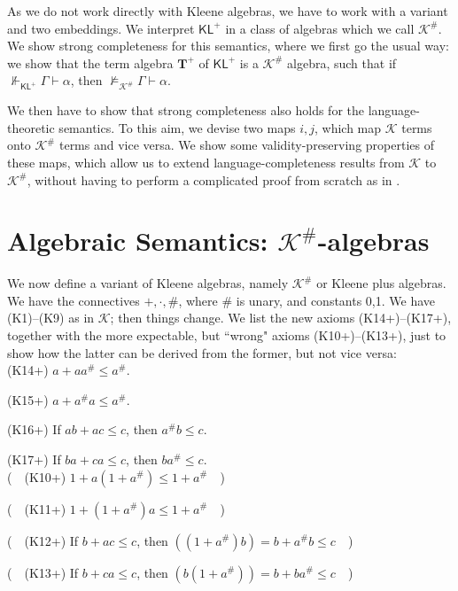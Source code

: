 \documentclass{eptcs}
\newcommand{\KA}{\mathcal{K}}
\newcommand{\KL}{\mathsf{KL}}
\begin{document}
As we do not work directly with
Kleene algebras, we have to work with a variant and two embeddings.
We interpret $\KL^+$ in a class of algebras
which we call $\KA^\#$. We show strong completeness for this 
semantics, where we first go
the usual way: we show that the term 
algebra $\textbf{T}^+$ of $\KL^+$ is a 
$\KA^\#$ algebra, such that if $\not\Vdash_{\KL^+}\Gamma\vdash\alpha$, 
then $\not\models_{\KA^\#}\Gamma\vdash\alpha$. 

We then have to show that strong completeness
also holds for the language-theoretic semantics. To this aim,
we devise two maps $i,j$, which map $\KA$ terms onto $\KA^\#$ terms
and vice versa. We show some validity-preserving 
properties of these maps,
which allow us to extend language-completeness results from
$\KA$ to $\KA^\#$, without having to perform a complicated proof from scratch
as in \cite{kozen:completeness}.


\section{Algebraic Semantics: $\KA^\#$-algebras}

We now define a variant of Kleene algebras, namely $\KA^\#$ or
Kleene plus algebras. We have the connectives $+,\cdot,\#$, where
$\#$ is unary, and constants 0,1.  We have (K1)--(K9) as in $\KA$;
then things change. We list the new axioms (K14+)--(K17+), together
with the more expectable, but ``wrong" axioms (K10+)--(K13+), just to show
how the latter can be derived from the former, but not vice versa:
\\

(K14+) $a+aa^\#\leq a^\#$. 

(K15+) $a+a^\#a\leq a^\#$.

(K16+) If $ab+ac\leq c$, then $a^\#b\leq c$.

(K17+) If $ba+ca\leq c$, then $ba^\#\leq c$.
\\

($\quad$(K10+) $1+a(1+a^\#)\leq 1+a^\#\quad$)

($\quad$(K11+) $1+(1+a^\#)a\leq 1+a^\#\quad$)

($\quad$(K12+) If $b+ac\leq c$, then $((1+a^\#)b)=b+a^\#b\leq c\quad$) 

($\quad$(K13+) If $b+ca\leq c$, then $(b(1+a^\#))=b+ba^\#\leq c\quad$) 
\\
\end{document}
